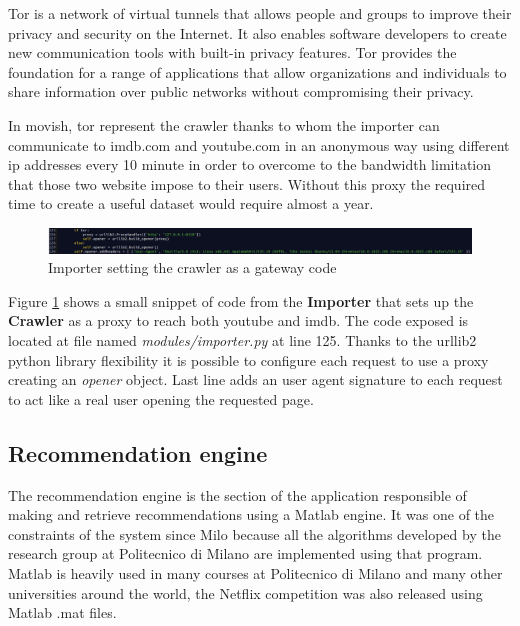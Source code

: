 Tor \cite{tor} is a network of virtual tunnels that allows people and groups to improve their privacy and security on the Internet. It also enables software developers to create new communication tools with built-in privacy features. Tor provides the foundation for a range of applications that allow organizations and individuals to share information over public networks without compromising their privacy.

In movish, tor represent the crawler thanks to whom the importer can communicate to imdb.com and youtube.com in an anonymous way using different ip addresses every 10 minute in order to overcome to the bandwidth limitation that those two website impose to their users. Without this proxy the required time to create a useful dataset would require almost a year.

\begin{figure}
  \centering
  \includegraphics[width=\textwidth]{figures/crawler_setting_code.png}
  \caption{Importer setting the crawler as a gateway code}
  \label{fig:importer_setting_crawler}
\end{figure}

Figure \ref{fig:importer_setting_crawler} shows a small snippet of code from the \textbf{Importer} that sets up the \textbf{Crawler} as a proxy to reach both youtube and imdb. The code exposed is located at file named \textit{modules/importer.py} at line 125. Thanks to the urllib2 python library flexibility it is possible to configure each request to use a proxy creating an \textit{opener} object. Last line adds an user agent signature to each request to act like a real user opening the requested page.

\subsection{Recommendation engine}
\label{sec:recommendation_engine}

The recommendation engine is the section of the application responsible of making and retrieve recommendations using a Matlab \cite{matlab} engine. It was one of the constraints of the system since Milo because all the algorithms developed by the research group at Politecnico di Milano are implemented using that program. Matlab is heavily used in many courses at Politecnico di Milano and many other universities around the world, the Netflix competition \cite{netflixprize} was also released using Matlab .mat files.

